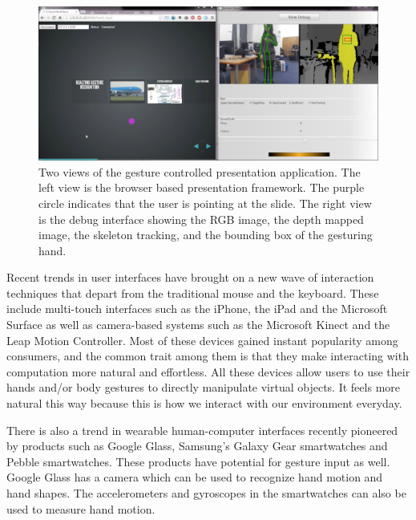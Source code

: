 \begin{figure}[tbh]
\centering
\includegraphics[width=\textwidth]{figures/point_ppt.png}
\caption{Two views of the gesture controlled presentation application. The
left view is the browser based presentation framework. The purple
circle indicates that the user is pointing at the slide. The right view is the
debug interface showing the RGB image, the depth mapped image, the skeleton
tracking, and the bounding box of the gesturing hand.}
\label{fig:demo-point}
\end{figure}
 
Recent trends in user interfaces have brought on a new wave of interaction
techniques that depart from the traditional mouse and the keyboard. These
include multi-touch interfaces such as the iPhone, the iPad and the Microsoft 
Surface as well as camera-based systems such as
the Microsoft Kinect and the Leap Motion Controller. Most
of these devices gained instant popularity among consumers, and the common trait
among them is that they make interacting with computation more natural and 
effortless. All these devices allow users to use their hands and/or body 
gestures to directly manipulate virtual objects. It feels more natural this 
way because this is how we interact with our environment everyday.
 
There is also a trend in wearable human-computer interfaces recently pioneered
by products such as Google Glass, Samsung's Galaxy Gear smartwatches and Pebble
smartwatches. These products have potential for gesture input as well. Google
Glass has a camera which can be used to recognize hand motion and hand shapes.
The accelerometers and gyroscopes in the smartwatches can also be used to
measure hand motion.

